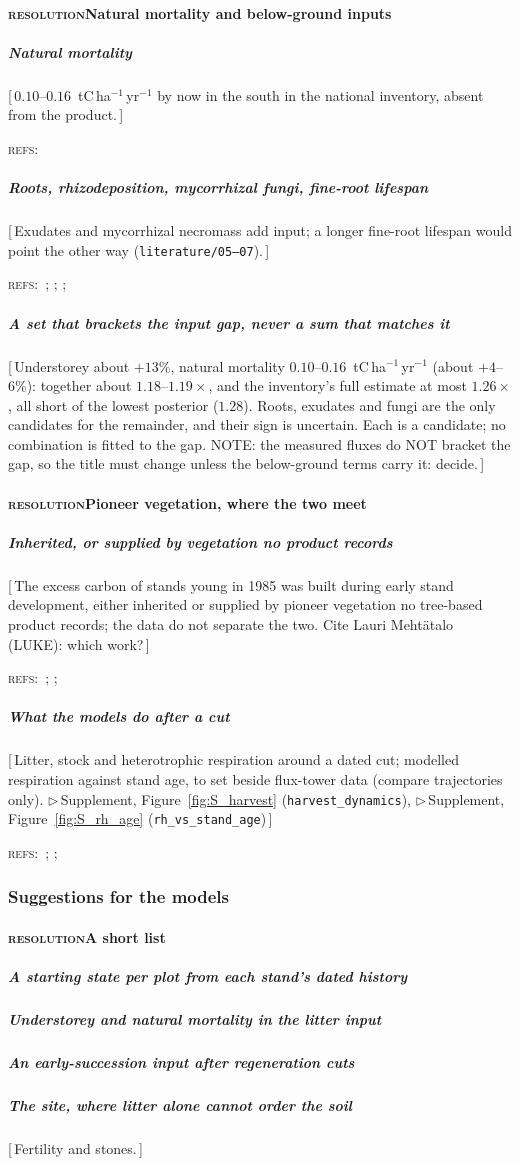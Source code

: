 \documentclass[11pt]{article}
\newcommand{\beat}[1]{\textcolor{black!45}{\textsc{\small #1}}\enspace}
\newcommand{\gap}[1]{\textcolor{red!70!black}{\small[\,#1\,]}}
\newcommand{\refs}[1]{\par\textcolor{red!70!black}{\footnotesize\textsc{refs:}\ #1}\par}
\newcommand{\suppanchor}[2]{\textcolor{red!70!black}{\small$\triangleright$\,Supplement,
  Figure~\ref{fig:#1} (\texttt{#2})}}
\begin{document}
\paragraph{\beat{resolution}Natural mortality and below-ground inputs}
\subparagraph{Natural mortality}
\gap{$0.10$--$0.16$~tC\,ha$^{-1}$\,yr$^{-1}$ by now in the south in the national inventory, absent
from the product.}
\refs{\citet{StatFin2025NID}}
\subparagraph{Roots, rhizodeposition, mycorrhizal fungi, fine-root lifespan}
\gap{Exudates and mycorrhizal necromass add input; a longer fine-root lifespan would point the
other way (\texttt{literature/05--07}).}
\refs{\citet{Bolinder2007}; \citet{Clemmensen2013}; \citet{Helmisaari2007}; \citet{Strand2008}}
\subparagraph{A set that brackets the input gap, never a sum that matches it}
\gap{Understorey about $+13\%$, natural mortality $0.10$--$0.16$~tC\,ha$^{-1}$\,yr$^{-1}$ (about
$+4$--$6\%$): together about $1.18$--$1.19\times$, and the inventory's full estimate at most
$1.26\times$, all short of the lowest posterior ($1.28$). Roots, exudates and fungi are the
only candidates for the remainder, and their sign is uncertain. Each is a candidate; no
combination is fitted to the gap. NOTE: the measured fluxes do NOT bracket the gap, so the title
must change unless the below-ground terms carry it: decide.}
\paragraph{\beat{resolution}Pioneer vegetation, where the two meet}
\subparagraph{Inherited, or supplied by vegetation no product records}
\gap{The excess carbon of stands young in 1985 was built during early stand development, either
inherited or supplied by pioneer vegetation no tree-based product records; the data do not
separate the two. Cite Lauri Mehtätalo (LUKE): which work?}
\refs{\citet{Rana2023}; \citet{Mehtatalo2025}; \citet{Palviainen2005}}
\subparagraph{What the models do after a cut}
\gap{Litter, stock and heterotrophic respiration around a dated cut; modelled respiration
against stand age, to set beside flux-tower data (compare trajectories only).
\suppanchor{S_harvest}{harvest\_dynamics}, \suppanchor{S_rh_age}{rh\_vs\_stand\_age}}
\refs{\citet{Kolari2004}; \citet{Kulmala2011}; \citet{Peichl2022}}

\subsubsection{Suggestions for the models}
\paragraph{\beat{resolution}A short list}
\subparagraph{A starting state per plot from each stand's dated history}
\subparagraph{Understorey and natural mortality in the litter input}
\subparagraph{An early-succession input after regeneration cuts}
\subparagraph{The site, where litter alone cannot order the soil}
\gap{Fertility and stones.}
\end{document}
